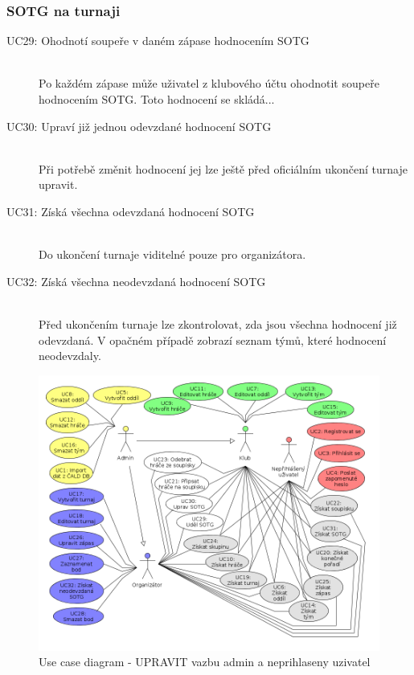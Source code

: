   \subsubsection*{SOTG na turnaji}
    \begin{description}
      \item[UC29: Ohodnotí soupeře v daném zápase hodnocením SOTG ] \hfill \\
      Po každém zápase může uživatel z klubového účtu ohodnotit soupeře hodnocením SOTG. Toto hodnocení se skládá...
      \item[UC30: Upraví již jednou odevzdané hodnocení SOTG ] \hfill \\
      Při potřebě změnit hodnocení jej lze ještě před oficiálním ukončení turnaje upravit.
      \item[UC31: Získá všechna odevzdaná hodnocení SOTG] \hfill \\
      Do ukončení turnaje viditelné pouze pro organizátora.
      \item[UC32: Získá všechna neodevzdaná hodnocení SOTG] \hfill \\
      Před ukončením turnaje lze zkontrolovat, zda jsou všechna hodnocení již odevzdaná.
      V opačném případě zobrazí seznam týmů, které hodnocení neodevzdaly.
    \end{description}
    
    
\begin{figure}[ht!]
\centering
\includegraphics[width=130mm]{./images/use-case.png}
\caption{Use case diagram - UPRAVIT vazbu admin a neprihlaseny uzivatel\label{overflow}}
\end{figure}
    

